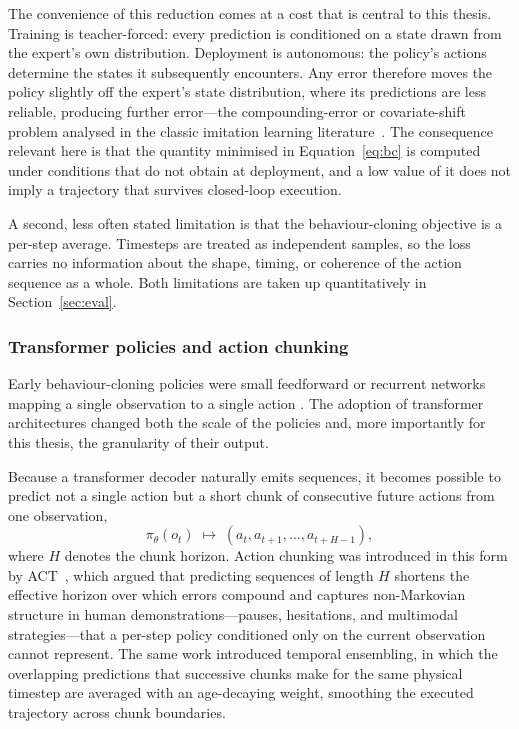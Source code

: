 \documentclass[english,12pt,a4paper,pdftex,elec,utf8]{aaltothesis}
\begin{document}
The convenience of this reduction comes at a cost that is central to this thesis. Training is teacher-forced: every prediction is conditioned on a state drawn from the expert's own distribution. Deployment is autonomous: the policy's actions determine the states it subsequently encounters. Any error therefore moves the policy slightly off the expert's state distribution, where its predictions are less reliable, producing further error---the compounding-error or covariate-shift problem analysed in the classic imitation learning literature~\cite{ross2010efficient, ross2011reduction}. The consequence relevant here is that the quantity minimised in
Equation~\eqref{eq:bc} is computed under conditions that do not obtain at deployment, and a low value of it does not imply a trajectory that survives closed-loop execution.

A second, less often stated limitation is that the behaviour-cloning objective
is a per-step average. Timesteps are treated as independent samples, so
the loss carries no information about the shape, timing, or coherence of the
action sequence as a whole. Both limitations are taken up quantitatively in
Section~\ref{sec:eval}.

\subsubsection{Transformer policies and action chunking}
\label{subsec:chunking}

Early behaviour-cloning policies were small feedforward or recurrent networks
mapping a single observation to a single action \cite{il}. The adoption of transformer architectures changed both the scale of the policies and, more importantly for this thesis, the granularity of their output.

Because a transformer decoder naturally emits sequences, it becomes possible to
predict not a single action but a short chunk of consecutive future
actions from one observation,
\begin{equation}
  \label{eq:chunk}
  \pi_\theta(o_t) \;\mapsto\; (a_t, a_{t+1}, \dots, a_{t+H-1}),
\end{equation}
where $H$ denotes the chunk horizon. Action chunking was introduced in this form by ACT~\cite{zhao2023learning}, which argued that predicting sequences of length $H$ shortens the effective horizon over which errors compound and captures non-Markovian structure in human demonstrations---pauses, hesitations, and multimodal strategies---that a per-step policy conditioned only on the current observation cannot represent. The same work introduced temporal ensembling, in which the overlapping predictions that successive chunks make for the same physical timestep are averaged with an age-decaying weight, smoothing the executed trajectory across chunk boundaries.
\end{document}
